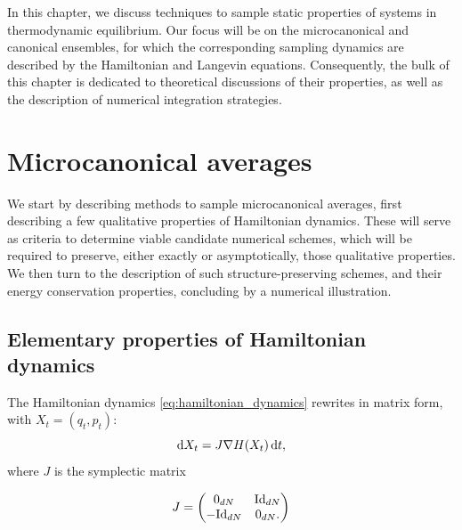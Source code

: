In this chapter, we discuss techniques to sample static properties of systems in thermodynamic equilibrium.
Our focus will be on the microcanonical and canonical ensembles, for which the corresponding sampling dynamics are described by the Hamiltonian and Langevin equations.
Consequently, the bulk of this chapter is dedicated to theoretical discussions of their properties, as well as the description of numerical integration strategies.

\section{Microcanonical averages}
We start by describing methods to sample microcanonical averages, first describing a few qualitative properties of Hamiltonian dynamics. 
These will serve as criteria to determine viable candidate numerical schemes, which will be required to preserve, either exactly or asymptotically,
those qualitative properties.
We then turn to the description of such structure-preserving schemes, and their energy conservation properties, concluding by a numerical illustration.

\subsection{Elementary properties of Hamiltonian dynamics}
The Hamiltonian dynamics \eqref{eq:hamiltonian_dynamics} rewrites in matrix form, with $X_t=(q_t,p_t)$:
\begin{equation}\label{eq:hamiltonian_dynamics_matrix_form} \text d X_t=J\nabla H(X_t)\,\mathrm{d}t,\end{equation}
where $J$ is the symplectic matrix

$$J = \begin{pmatrix}
    0_{dN} & \mathrm{Id}_{dN}\\ -\mathrm{Id}_{dN} & 0_{dN}.
\end{pmatrix}$$

